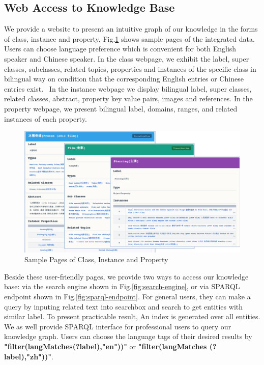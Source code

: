 \documentclass[runningheads,a4paper]{llncs}
\begin{document}
\begin{CJK*}{UTF8}{song}
\subsection{Web Access to Knowledge Base}
We provide a website to present an intuitive graph of our knowledge in the forms of class, instance and property. Fig.\ref{fig:xlore} shows sample pages of the integrated data. Users can choose language preference which is convenient for both English speaker and Chinese speaker. In the class webpage, we exhibit the label, super classes, subclasses, related topics, properties and instances of the specific class in bilingual way on condition that the corresponding English entries or Chinese entries exist.  In the instance webpage we display bilingual label, super classes, related classes, abstract, property key value pairs, images and references. In the property webpage, we present bilingual label, domains, ranges, and related instances of each property.

\begin{figure}[ht]
    \centerline{\includegraphics[width=1\columnwidth]{fig/xlore}}
    \caption{Sample Pages of Class, Instance and Property}
    \label{fig:xlore}
\end{figure}

Beside these user-friendly pages, we provide two ways to access our knowledge base: via the search engine shown in Fig.\ref{fig:search-engine}, or via SPARQL endpoint shown in Fig.\ref{fig:sparql-endpoint}. For general users, they can make a query by inputing related text into searchbox and search to get entities with similar label. To present practicable result, An index is generated over all entities. We as well provide SPARQL interface for professional users to query our knowledge graph. Users can choose the language tags of their desired results by \textbf{"filter(langMatches(?label),"en"))"} or \textbf{"filter(langMatches (?label),"zh"))"}.%


\end{CJK*}
\end{document}
